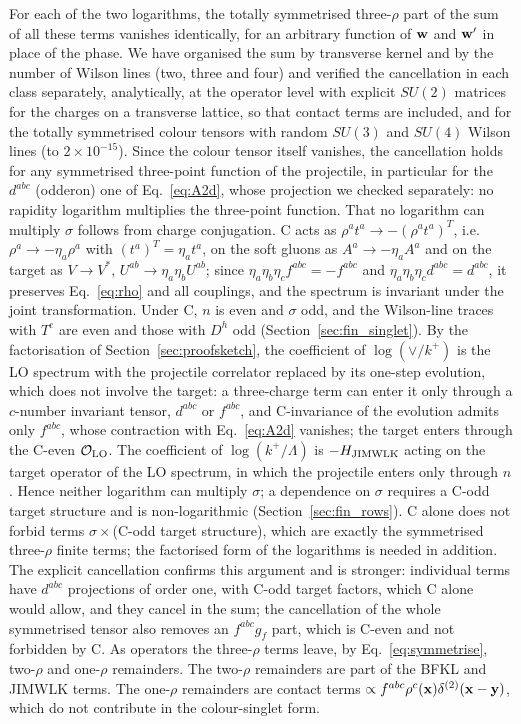 For each of the two logarithms, the totally symmetrised three-$\rho$ part of the sum of all these terms vanishes identically, for an arbitrary function of $\mathbf{w}$ and $\mathbf{w}'$ in place of the phase. We have organised the sum by transverse kernel and by the number of Wilson lines (two, three and four) and verified the cancellation in each class separately, analytically, at the operator level with explicit $SU(2)$ matrices for the charges on a transverse lattice, so that contact terms are included, and for the totally symmetrised colour tensors with random $SU(3)$ and $SU(4)$ Wilson lines (to $2\times10^{-15}$). Since the colour tensor itself vanishes, the cancellation holds for any symmetrised three-point function of the projectile, in particular for the $d^{abc}$ (odderon) one of Eq.~\eqref{eq:A2d}, whose projection we checked separately: no rapidity logarithm multiplies the three-point function. That no logarithm can multiply $\sigma$ follows from charge conjugation. C acts as $\rho^at^a\to-(\rho^at^a)^T$, i.e.\ $\rho^a\to-\eta_a\rho^a$ with $(t^a)^T=\eta_at^a$, on the soft gluons as $A^a\to-\eta_aA^a$ and on the target as $V\to V^*$, $U^{ab}\to\eta_a\eta_bU^{ab}$; since $\eta_a\eta_b\eta_cf^{abc}=-f^{abc}$ and $\eta_a\eta_b\eta_cd^{abc}=d^{abc}$, it preserves Eq.~\eqref{eq:rho} and all couplings, and the spectrum is invariant under the joint transformation. Under C, $n$ is even and $\sigma$ odd, and the Wilson-line traces with $T^e$ are even and those with $D^h$ odd (Section~\ref{sec:fin_singlet}). By the factorisation of Section~\ref{sec:proofsketch}, the coefficient of $\log(\vee/k^+)$ is the LO spectrum with the projectile correlator replaced by its one-step evolution, which does not involve the target: a three-charge term can enter it only through a $c$-number invariant tensor, $d^{abc}$ or $f^{abc}$, and C-invariance of the evolution admits only $f^{abc}$, whose contraction with Eq.~\eqref{eq:A2d} vanishes; the target enters through the C-even $\mathcal O_{\rm LO}$. The coefficient of $\log(k^+/\Lambda)$ is $-H_{\rm JIMWLK}$ acting on the target operator of the LO spectrum, in which the projectile enters only through $n$. Hence neither logarithm can multiply $\sigma$; a dependence on $\sigma$ requires a C-odd target structure and is non-logarithmic (Section~\ref{sec:fin_rows}). C alone does not forbid terms $\sigma\times$(C-odd target structure), which are exactly the symmetrised three-$\rho$ finite terms; the factorised form of the logarithms is needed in addition. The explicit cancellation confirms this argument and is stronger: individual terms have $d^{abc}$ projections of order one, with C-odd target factors, which C alone would allow, and they cancel in the sum; the cancellation of the whole symmetrised tensor also removes an $f^{abc}g_f$ part, which is C-even and not forbidden by C. As operators the three-$\rho$ terms leave, by Eq.~\eqref{eq:symmetrise}, two-$\rho$ and one-$\rho$ remainders. The two-$\rho$ remainders are part of the BFKL and JIMWLK terms. The one-$\rho$ remainders are contact terms $\propto f^{abc}\rho^c(\mathbf{x})\delta^{(2)}(\mathbf{x}-\mathbf{y})$, which do not contribute in the colour-singlet form.

